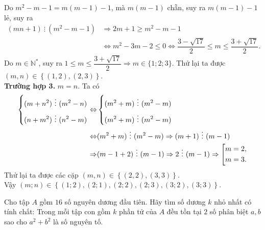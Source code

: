 \begin{ex}
{Do $m^2-m-1=m(m-1)-1$, mà $m(m-1)$ chẵn, suy ra $m(m-1)-1$ lẻ, suy ra
$$\begin{aligned}
(mn+1) \ \vdots \ (m^2-m-1)&\Rightarrow 2m+1\geq m^2-m-1\\ &\Leftrightarrow m^2-3m-2\leq 0\Leftrightarrow \dfrac{3-\sqrt{17}}{2}\leq m\leq \dfrac{3+\sqrt{17}}{2}.
\end{aligned}$$
Do $m\in\mathbb{N}^*$, suy ra $1\leq m\leq \dfrac{3+\sqrt{17}}{2}\Rightarrow m\in\{1;2;3\}$. 
Thử lại ta được $(m,n)\in\left\{(1,2),(2,3)\right\}$.\\
\textbf{Trường hợp 3.} $m=n$. Ta có
$$\begin{aligned}
\heva{&(m+n^2) \ \vdots \  (m^2-n)\\&(n+m^2) \ \vdots \  (n^2-m)}\Leftrightarrow& \heva{&(m^2+m) \ \vdots \  (m^2-m)\\&(m^2+m) \ \vdots \ (m^2-m)}\\ 
\Leftrightarrow& (m^2+m) \ \vdots \ (m^2-m)\Rightarrow (m+1) \ \vdots \ (m-1)\\
\Rightarrow& (m-1+2) \ \vdots \ (m-1)\Rightarrow 2 \ \vdots \ (m-1)\Rightarrow \hoac{&m=2,\\&m=3.}
\end{aligned}$$
Thử lại ta được các cặp $(m,n)\in \left\{(2,2),(3,3)\right\}$.\\
Vậy $(m;n)\in \left\{(1;2),(2;1),(2;2),(2;3),(3;2),(3;3)\right\}$.
}
\end{ex}

\begin{ex}%
 Cho tập $A$ gồm $16$ số nguyên dương đầu tiên. Hãy tìm số dương $k$ nhỏ nhất có tính chất: Trong mỗi tập con gồm $k$ phần tử của $A$ đều tồn tại $2$ số phân biệt $a, b$ sao cho $a^2+b^2$ là số nguyên tố.
\end{ex}

